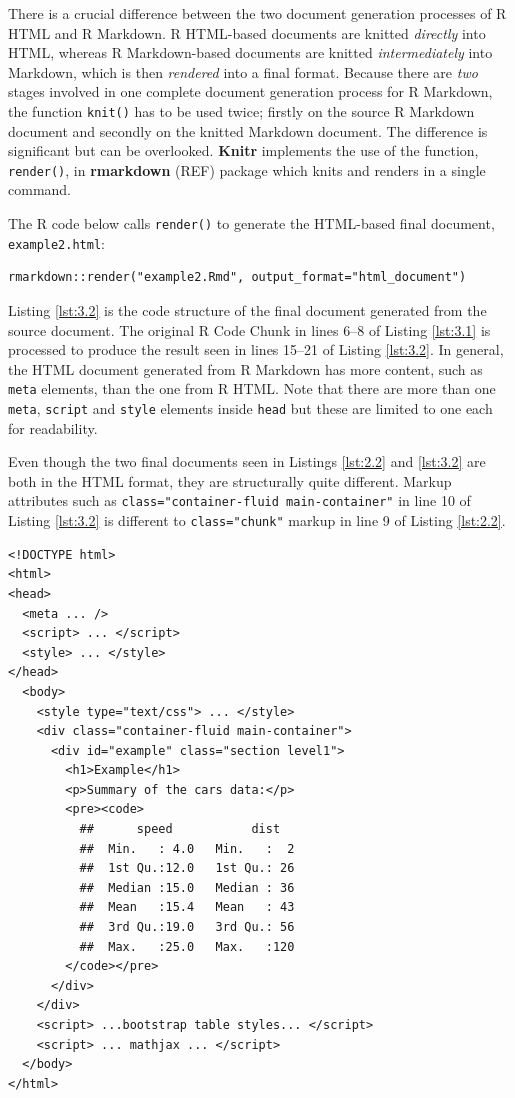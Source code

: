 \documentclass[a4paper, 12pt]{report}
\begin{document}
There is a crucial difference between the two document generation processes of R HTML and R Markdown. R HTML-based documents are knitted \emph{directly} into HTML, whereas R Markdown-based documents are knitted \emph{intermediately} into Markdown, which is then \emph{rendered} into a final format. Because there are \emph{two} stages involved in one complete document generation process for R Markdown, the function \texttt{knit()} has to be used twice; firstly on the source R Markdown document and secondly on the knitted Markdown document. The difference is significant but can be overlooked. \textbf{Knitr} implements the use of the function, \texttt{render()}, in \textbf{rmarkdown} (REF) package which knits and renders in a single command. 

The R code below calls \texttt{render()} to generate the HTML-based final document, \texttt{example2.html}:
\begin{lstlisting}[numbers=none, frame=none]
rmarkdown::render("example2.Rmd", output_format="html_document")
\end{lstlisting}

Listing \ref{lst:3.2} is the code structure of the final document generated from the source document. The original R Code Chunk in lines 6--8 of Listing \ref{lst:3.1} is processed to produce the result seen in lines 15--21 of Listing \ref{lst:3.2}. In general, the HTML document generated from R Markdown has more content, such as \texttt{meta} elements, than the one from R HTML. Note that there are more than one \texttt{meta}, \texttt{script} and \texttt{style} elements inside \texttt{head} but these are limited to one each for readability.

Even though the two final documents seen in Listings \ref{lst:2.2} and \ref{lst:3.2} are both in the HTML format, they are structurally quite different. Markup attributes such as \texttt{class="container-fluid main-container"} in line 10 of Listing \ref{lst:3.2} is different to \texttt{class="chunk"} markup in line 9 of Listing \ref{lst:2.2}.
\begin{lstlisting}[caption={(tidied) \texttt{example2.html}}, escapechar=\|, label={lst:3.2}]
<!DOCTYPE html>
<html>
<head>
  <meta ... />
  <script> ... </script>
  <style> ... </style>
</head>
  <body>
    <style type="text/css"> ... </style>
    <div class="container-fluid main-container">
      <div id="example" class="section level1">
        <h1>Example</h1>
        <p>Summary of the cars data:</p>
        <pre><code>
          ##      speed           dist    
    	  ##  Min.   : 4.0   Min.   :  2  
    	  ##  1st Qu.:12.0   1st Qu.: 26  
    	  ##  Median :15.0   Median : 36  
    	  ##  Mean   :15.4   Mean   : 43  
    	  ##  3rd Qu.:19.0   3rd Qu.: 56  
    	  ##  Max.   :25.0   Max.   :120
    	</code></pre>
      </div>
    </div>
    <script> ...bootstrap table styles... </script>
    <script> ... mathjax ... </script>    
  </body>
</html>
\end{lstlisting}
\end{document}

